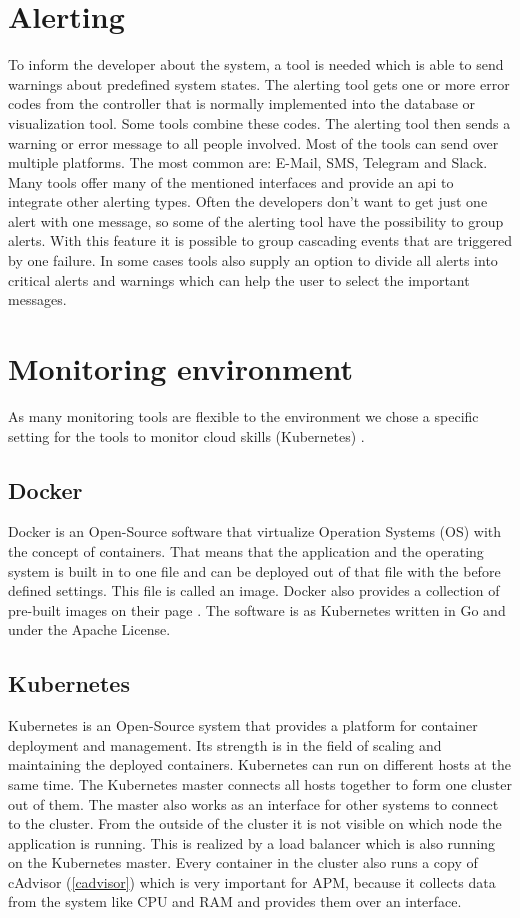 \section{Alerting}
\label{alerting}
To inform the developer about the system, a tool is needed which is able to send warnings about predefined system states.
The alerting tool gets one or more error codes from the controller that is normally implemented into the database or visualization tool. Some tools combine these codes. The alerting tool then sends a warning or error message to all people involved. Most of the tools can send over multiple platforms. The most common are: E-Mail, SMS, Telegram and Slack. Many tools offer many of the mentioned interfaces and provide an api to integrate other alerting types.
Often the developers don’t want to get just one alert with one message, so some of the alerting tool have the possibility to group alerts. With this feature it is possible to group cascading events that are triggered by one failure. In some cases tools also supply an option to divide all alerts into critical alerts and warnings which can help the user to select the important messages.  

\section{Monitoring environment}
\label{monitoringenviroment}
As many monitoring tools are flexible to the environment we chose a specific setting for the tools to monitor cloud skills (Kubernetes) \cite{Vohra2016}. 
\subsection{Docker}
Docker is an Open-Source software that virtualize Operation Systems (OS) with the concept of containers. That means that the application and the operating system is built in to one file and can be deployed out of that file with the before defined settings. This file is called an image. Docker also provides a collection of pre-built images on their page  \cite{Docker}. The software is as Kubernetes written in Go and under the Apache License.

\subsection{Kubernetes}
Kubernetes is an Open-Source system that provides a platform for container deployment and management. Its strength is in the field of scaling and maintaining the deployed containers. Kubernetes can run on different hosts at the same time. The Kubernetes master connects all hosts together to form one cluster out of them. The master also works as an interface for other systems to connect to the cluster. From the outside of the cluster it is not visible on which node the application is running. This is realized by a load balancer which is also running on the Kubernetes master. Every container in the cluster also runs a copy of cAdvisor (\ref{cadvisor}) which is very important for APM, because it collects data from the system like CPU and RAM and provides them over an interface.
